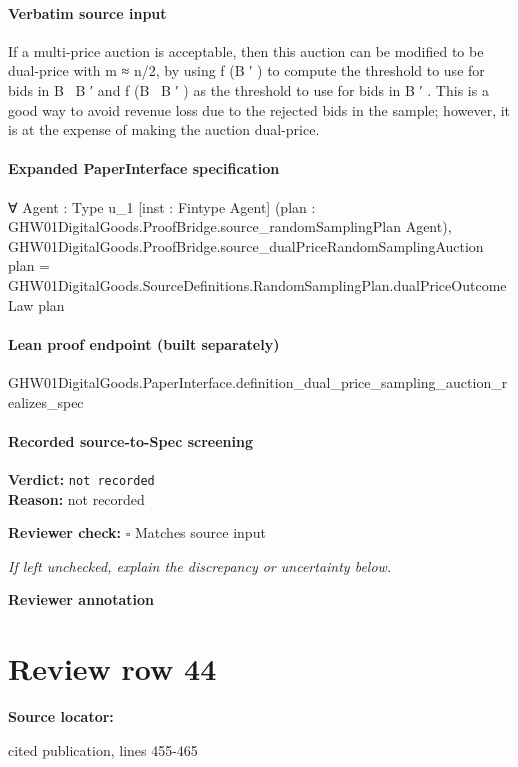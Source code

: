 \documentclass[10pt]{article}
\newcommand{\reviewerbox}{%
  \par\noindent\fbox{\parbox{0.96\linewidth}{\rule{0pt}{0.38in}}}\par
}
\newcommand{\reviewmatch}[1]{%
  \par\noindent\textbf{Reviewer check:} $\square$\; #1\par
  \noindent\emph{If left unchecked, explain the discrepancy or uncertainty below.}\par
}
\begin{document}
\paragraph{Verbatim source input}
\begin{ReviewVerbatim}
If a multi-price auction is acceptable, then this auction can be modified to be dual-price with m ≈ n/2,
by using f (B ′ ) to compute the threshold to use for
bids in B \ B ′ and f (B \ B ′ ) as the threshold to use
for bids in B ′ . This is a good way to avoid revenue
loss due to the rejected bids in the sample; however,
it is at the expense of making the auction dual-price.
\end{ReviewVerbatim}


\paragraph{Expanded PaperInterface specification}
\begin{ReviewVerbatim}
∀ {Agent : Type u_1} [inst : Fintype Agent] (plan : GHW01DigitalGoods.ProofBridge.source_randomSamplingPlan Agent),
  GHW01DigitalGoods.ProofBridge.source_dualPriceRandomSamplingAuction plan =
    GHW01DigitalGoods.SourceDefinitions.RandomSamplingPlan.dualPriceOutcomeLaw plan
\end{ReviewVerbatim}

\paragraph{Lean proof endpoint (built separately)}\begin{ReviewVerbatim}
GHW01DigitalGoods.PaperInterface.definition_dual_price_sampling_auction_realizes_spec
\end{ReviewVerbatim}

\paragraph{Recorded source-to-Spec screening}
\textbf{Verdict:} \texttt{not recorded}
\\
\textbf{Reason:} not recorded
\reviewmatch{Matches source input}
\noindent\textbf{Reviewer annotation}\par
\reviewerbox
\clearpage
\hypertarget{source-claim-58e846d929de7a05}{}
\section*{Review row 44}
\textbf{Source locator:} {\footnotesize\raggedright cited publication, lines 455-\allowbreak{}465\par}
\end{document}
